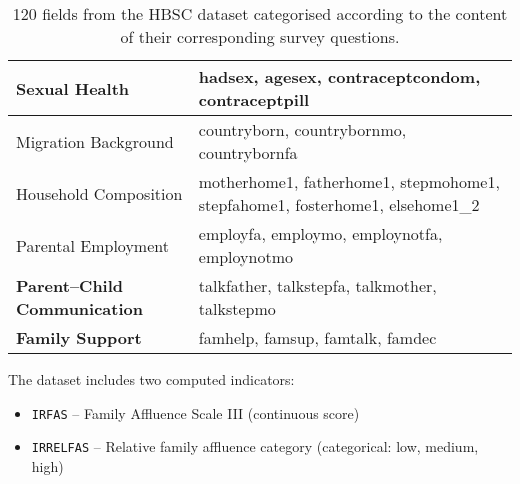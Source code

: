 \documentclass[main.tex]{subfiles}
\begin{document}
\begin{table}[!ht]
\begin{tabular}{|p{40mm}|p{100mm}|}
    Sexual Health & hadsex, agesex, contraceptcondom, contraceptpill \\ \hline
    Migration Background & countryborn, countrybornmo, countrybornfa \\ \hline
    Household Composition & motherhome1, fatherhome1, stepmohome1, stepfahome1, fosterhome1, elsehome1\_2 \\ \hline
    Parental Employment & employfa, employmo, employnotfa, employnotmo \\ \hline
    \textbf{Parent–Child Communication} & talkfather, talkstepfa, talkmother, talkstepmo \\ \hline
    \textbf{Family Support} & famhelp, famsup, famtalk, famdec \\ \hline
  \end{tabular}
  \caption{120 fields from the HBSC dataset categorised according to the content of their corresponding survey questions. }
  \label{tab:hbsc_variables_grouped}
\end{table}
The dataset includes two computed indicators:
\begin{itemize}
 \item \texttt{IRFAS} – Family Affluence Scale III (continuous score)
 \item \texttt{IRRELFAS} – Relative family affluence category (categorical: low, medium, high)
\end{itemize}
 
\end{document}
